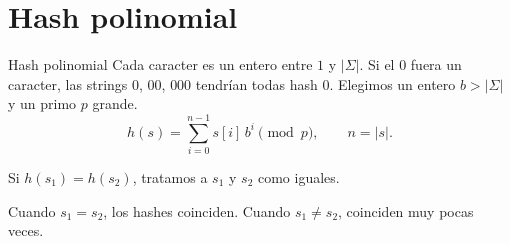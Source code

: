 \section{Hash polinomial}

\begin{frame}{Hash polinomial}
  Cada caracter es un entero entre \(1\) y \(|\Sigma|\).
  Si el \(0\) fuera un caracter, las strings \(0\), \(00\), \(000\) tendrían todas hash \(0\).
  Elegimos un entero \(b > |\Sigma|\) y un primo \(p\) grande.
  \[
    h(s) = \sum_{i=0}^{n-1} s[i]\, b^{i} \pmod{p},
    \qquad n = |s|.
  \]

  \medskip
  Si \(h(s_1) = h(s_2)\), tratamos a \(s_1\) y \(s_2\) como iguales.

  \medskip
  Cuando \(s_1 = s_2\), los hashes coinciden.
  Cuando \(s_1 \neq s_2\), coinciden muy pocas veces.
\end{frame}
